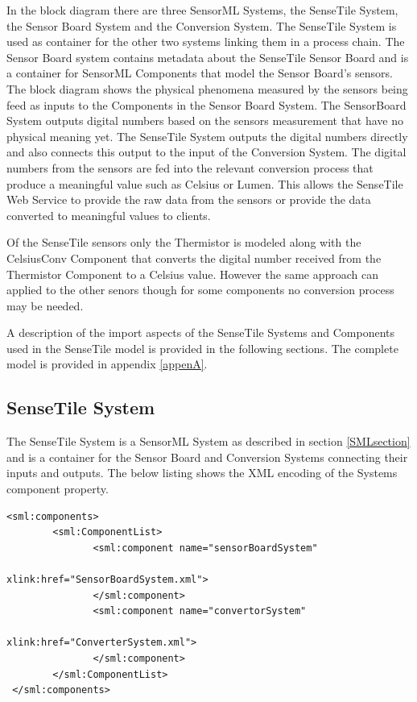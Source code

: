 \documentclass[]{final_report}
\begin{document}
In the block diagram there are three SensorML Systems, the SenseTile System, the Sensor Board System and the Conversion System. The SenseTile System is used as container for the other two systems linking them in a process chain. The Sensor Board system contains metadata about the SenseTile Sensor Board and is a container for SensorML Components that model the Sensor Board's sensors.
\newpage
The block diagram shows the physical phenomena measured by the sensors being feed as inputs to the Components in the Sensor Board System. The SensorBoard System outputs digital numbers based on the sensors measurement that have no physical meaning yet. The SenseTile System outputs the digital numbers directly and also connects this output to the input of the Conversion System. The digital numbers from the sensors are fed into the relevant conversion process that produce a meaningful value such as Celsius or Lumen. This allows the SenseTile Web Service to provide the raw data from the sensors or provide the data converted to meaningful values to clients.

Of the SenseTile sensors only the Thermistor is modeled along with the  CelsiusConv Component that converts the digital number received from the Thermistor Component to a Celsius value. However the same approach can applied to the other senors though for some components no conversion process may be needed.

A description of the  import aspects of the SenseTile Systems and Components used in the SenseTile model is provided in the following sections. The complete model is provided in appendix \ref{appenA}.

\subsection{SenseTile System}
The SenseTile System is a SensorML System as described in section \ref{SMLsection} and is a container for the Sensor Board and Conversion Systems connecting their inputs and outputs. The below listing shows the XML encoding of the Systems component property.
\newline 
\lstset{language=XML,basicstyle=\scriptsize,frame=single}
\begin{lstlisting}[label=componentListing,caption=SenseTile System Components List]
<sml:components>
        <sml:ComponentList>
               <sml:component name="sensorBoardSystem" 
                                          xlink:href="SensorBoardSystem.xml">
               </sml:component>
               <sml:component name="convertorSystem"  
                                          xlink:href="ConverterSystem.xml">
               </sml:component>
        </sml:ComponentList>			   
 </sml:components>
\end{lstlisting}
\end{document}
